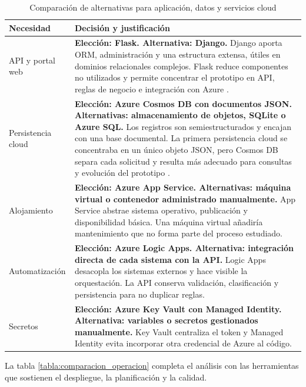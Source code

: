 \begin{table}[ht]
\centering
\footnotesize
\begin{tabularx}{\textwidth}{p{3.1cm} X}
\textbf{Necesidad} & \textbf{Decisión y justificación} \\
\hline
API y portal web & \textbf{Elección: Flask. Alternativa: Django.} Django aporta ORM, administración y una estructura extensa, útiles en dominios relacionales complejos. Flask reduce componentes no utilizados y permite concentrar el prototipo en API, reglas de negocio e integración con Azure \cite{django_overview}. \\
Persistencia cloud & \textbf{Elección: Azure Cosmos DB con documentos JSON. Alternativas: almacenamiento de objetos, SQLite o Azure SQL.} Los registros son semiestructurados y encajan con una base documental. La primera persistencia cloud se concentraba en un único objeto JSON, pero Cosmos DB separa cada solicitud y resulta más adecuado para consultas y evolución del prototipo \cite{azure_cosmos_overview,azure_cosmos_python}. \\
Alojamiento & \textbf{Elección: Azure App Service. Alternativas: máquina virtual o contenedor administrado manualmente.} App Service abstrae sistema operativo, publicación y disponibilidad básica. Una máquina virtual añadiría mantenimiento que no forma parte del proceso estudiado. \\
Automatización & \textbf{Elección: Azure Logic Apps. Alternativa: integración directa de cada sistema con la API.} Logic Apps desacopla los sistemas externos y hace visible la orquestación. La API conserva validación, clasificación y persistencia para no duplicar reglas. \\
Secretos & \textbf{Elección: Azure Key Vault con Managed Identity. Alternativa: variables o secretos gestionados manualmente.} Key Vault centraliza el token y Managed Identity evita incorporar otra credencial de Azure al código. \\
\end{tabularx}
\caption{Comparación de alternativas para aplicación, datos y servicios cloud}
\label{tabla:comparacion_alternativas}
\end{table}

La tabla \ref{tabla:comparacion_operacion} completa el análisis con las herramientas que sostienen el despliegue, la planificación y la calidad.

